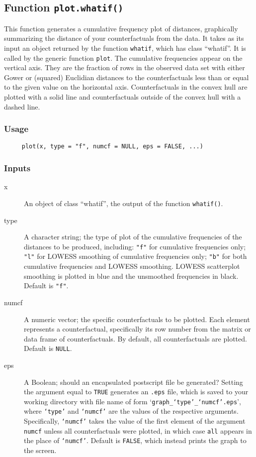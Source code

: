 \documentclass[oneside,letterpaper,titlepage]{article}
\begin{document}
\subsection{Function \texttt{plot.whatif()}}

This function generates a cumulative frequency plot of distances,
graphically summarizing the distance of your counterfactuals from the
data.  It takes as its input an object returned by the function
\texttt{whatif}, which has class ``whatif''.  It is called by the
generic function \texttt{plot}.  The cumulative frequencies appear on
the vertical axis.  They are the fraction of rows in the observed data
set with either Gower or (squared) Euclidian distances to the
counterfactuals less than or equal to the given value on the
horizontal axis.  Counterfactuals in the convex hull are plotted with
a solid line and counterfactuals outside of the convex hull with a
dashed line.

\subsubsection{Usage}

\begin{verbatim}
     plot(x, type = "f", numcf = NULL, eps = FALSE, ...)
\end{verbatim}

\subsubsection{Inputs}

\begin{description}
\item[x] An object of class ``whatif'', the output of the function
  \texttt{whatif()}.
\item[type] A character string; the type of plot of the cumulative
  frequencies of the distances to be produced, including:
  \texttt{"f"} for cumulative frequencies only; \texttt{"l"} for
  LOWESS smoothing of cumulative frequencies only; \texttt{"b"} for
  both cumulative frequencies and LOWESS smoothing.  LOWESS
  scatterplot smoothing is plotted in blue and the unsmoothed
  frequencies in black.  Default is \texttt{"f"}.
\item[numcf] A numeric vector; the specific counterfactuals to be
  plotted.  Each element represents a counterfactual, specifically its
  row number from the matrix or data frame of counterfactuals.  By default, all
  counterfactuals are plotted.  Default is \texttt{NULL}.
\item[eps] A Boolean; should an encapsulated postscript file be
  generated?  Setting the argument equal to \texttt{TRUE} generates an
  \texttt{.eps} file, which is saved to your working directory with
  file name of form `\texttt{graph\_`type'\_`numcf'.eps}', where \texttt{`type'}
  and \texttt{`numcf'} are the values of the respective arguments.  Specifically, 
  \texttt{`numcf'} takes the value of the first element of the argument \texttt{numcf}  
  unless all counterfactuals were plotted, in which case \texttt{all} appears in the place of 
  \texttt{`numcf'}.  Default is \texttt{FALSE}, which instead 
  prints the graph to the screen.
\end{description}
\end{document}
